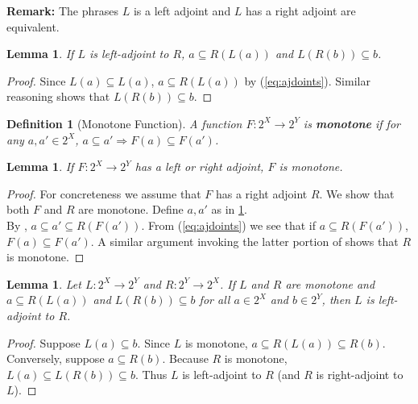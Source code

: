\documentclass{article}
\newtheorem{lemma}[proposition]{Lemma}
\newtheorem{definition}[proposition]{Definition}
\numberwithin{equation}{section}
\begin{document}
\textbf{Remark:} The phrases $L$ is a left adjoint and $L$ has a right adjoint are equivalent. 

\begin{lemma}\label{lem:inv-img-adjoint-lem-1}
If $L$ is left-adjoint to $R$, $a \subseteq R(L(a))$ and $L(R(b)) \subseteq b$.
\end{lemma}

\begin{proof}
Since $L(a) \subseteq L(a)$, $a \subseteq R(L(a))$ by (\ref{eq:ajdoints}). Similar reasoning shows that $L(R(b)) \subseteq b$.
\end{proof}

\begin{definition}[Monotone Function]\label{def:monotone-function}
A function $F : 2^X \to 2^Y$ is \textbf{monotone} if for any $a, a' \in 2^X$, $a \subseteq a' \Rightarrow F(a) \subseteq F(a')$.
\end{definition}

\begin{lemma}\label{lem:inv-image-adjoints-monotone}
If $F : 2^X \to 2^Y$ has a left or right adjoint, $F$ is monotone.
\end{lemma}

\begin{proof}
For concreteness we assume that $F$ has a right adjoint $R$. We show that both $F$ and $R$ are monotone. Define $a, a'$ as in \cref{def:monotone-function}.\\

By , $a \subseteq a' \subseteq R(F(a'))$. From (\ref{eq:ajdoints}) we see that if $a \subseteq R(F(a'))$, $F(a) \subseteq F(a')$. A similar argument invoking the latter portion of  shows that $R$ is monotone.
\end{proof}

\begin{lemma}
Let $L : 2^X \to 2^Y$ and $R : 2^Y \to 2^X$. If $L$ and $R$ are monotone and $a \subseteq R(L(a))$ and $L(R(b)) \subseteq b$ for all $a \in 2^X$ and $b \in 2^Y$, then $L$ is left-adjoint to $R$.
\end{lemma}

\begin{proof}
Suppose $L(a) \subseteq b$. Since $L$ is monotone, $a \subseteq R(L(a)) \subseteq R(b)$. Conversely, suppose $a \subseteq R(b)$. Because $R$ is monotone, $L(a) \subseteq L(R(b)) \subseteq b$. Thus $L$ is left-adjoint to $R$ (and $R$ is right-adjoint to $L$).
\end{proof}
\end{document}
